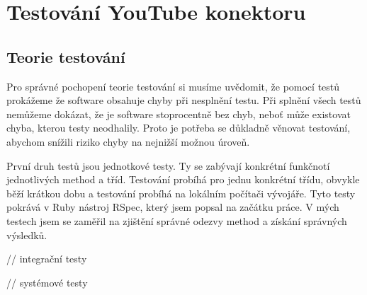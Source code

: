 \section{Testování YouTube konektoru}
\subsection{Teorie testování}
\par Pro správné pochopení teorie testování si musíme uvědomit, že pomocí testů prokážeme že software obsahuje chyby při nesplnění testu. Při splnění všech testů nemůžeme dokázat, že je software stoprocentně bez chyb, neboť může existovat chyba, kterou testy neodhalily. Proto je potřeba se důkladně věnovat testování, abychom snížili riziko chyby na nejnižší možnou úroveň.
\par První druh testů jsou jednotkové testy. Ty se zabývají konkrétní funkčnotí jednotlivých method a tříd. Testování probíhá pro jednu konkrétní třídu, obvykle běží krátkou dobu a testování probíhá na lokálním počítači vývojáře. Tyto testy pokrává v Ruby nástroj RSpec, který jsem popsal na začátku práce. V mých testech jsem se zaměřil na zjištění správné odezvy method a získání správných výsledků. 
\par // integrační testy
\par // systémové testy

